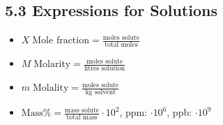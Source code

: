 \subsection{5.3 Expressions for Solutions}
\begin{itemize}
    \item $X \; \textrm{Mole fraction} = \frac{\textrm{moles solute}}{\textrm{total moles}}$
    \item $M \; \textrm{Molarity} = \frac{\textrm{moles solute}}{\textrm{litres solution}}$
    \item $m \; \textrm{Molality} = \frac{\textrm{moles solute}}{\textrm{kg solvent}}$
    \item $\textrm{Mass} \% = \frac{\textrm{mass solute}}{\textrm{total mass}} \cdot 10^2$, ppm: $\cdot 10^6$, ppb: $\cdot 10^9$
\end{itemize}